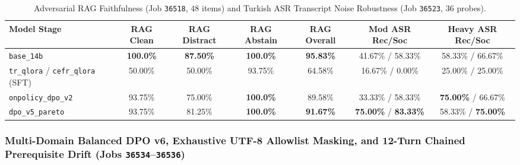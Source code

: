 \documentclass[a4paper,12pt]{report}
\begin{document}
\begin{table}[htbp]
\centering
\small
\caption{Adversarial RAG Faithfulness (Job \texttt{36518}, $48$ items) and Turkish ASR Transcript Noise Robustness (Job \texttt{36523}, $36$ probes).}
\label{tab:exp32_35_faith_asr}
\scriptsize\setlength{\tabcolsep}{2.5pt}
\begin{tabularx}{\textwidth}{>{\RaggedRight\arraybackslash}Xcccccc}
\toprule
\textbf{Model Stage} & \textbf{RAG Clean} & \textbf{RAG Distract} & \textbf{RAG Abstain} & \textbf{RAG Overall} & \textbf{Mod ASR Rec/Soc} & \textbf{Heavy ASR Rec/Soc} \\
\midrule
\texttt{base\_14b} & \textbf{100.0\%} & \textbf{87.50\%} & \textbf{100.0\%} & \textbf{95.83\%} & 41.67\% / 58.33\% & 58.33\% / 66.67\% \\
\texttt{tr\_qlora} / \texttt{cefr\_qlora} (SFT) & 50.00\% & 50.00\% & 93.75\% & 64.58\% & 16.67\% / 0.00\% & 25.00\% / 25.00\% \\
\texttt{onpolicy\_dpo\_v2} & 93.75\% & 75.00\% & \textbf{100.0\%} & 89.58\% & 33.33\% / 58.33\% & \textbf{75.00\%} / 66.67\% \\
\texttt{dpo\_v5\_pareto} & 93.75\% & 81.25\% & \textbf{100.0\%} & \textbf{91.67\%} & \textbf{75.00\%} / \textbf{83.33\%} & 58.33\% / \textbf{75.00\%} \\
\bottomrule
\end{tabularx}
\end{table}

\subsubsection{Multi-Domain Balanced DPO v6, Exhaustive UTF-8 Allowlist Masking, and 12-Turn Chained Prerequisite Drift (Jobs \texttt{36534}--\texttt{36536})}
\label{sec:exp37_39_suite}
\end{document}
